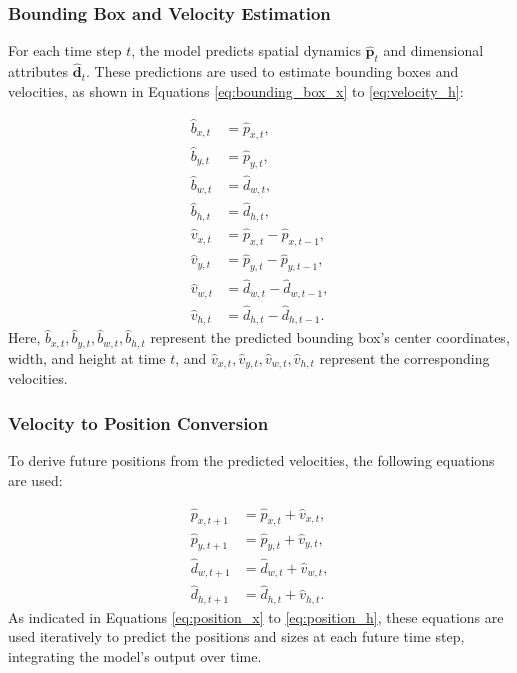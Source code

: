 \documentclass[12pt,oneside]{book} %
\begin{document}
\subsubsection*{Bounding Box and Velocity Estimation}
\noindent For each time step \(t\), the model predicts spatial dynamics \(\hat{\mathbf{p}}_t\) and dimensional attributes \(\hat{\mathbf{d}}_t\). These predictions are used to estimate bounding boxes and velocities, as shown in Equations \eqref{eq:bounding_box_x} to \eqref{eq:velocity_h}:

\begin{align}
    \hat{b}_{x,t} & = \hat{p}_{x,t},                    \label{eq:bounding_box_x} \\
    \hat{b}_{y,t} & = \hat{p}_{y,t},                    \label{eq:bounding_box_y} \\
    \hat{b}_{w,t} & = \hat{d}_{w,t},                    \label{eq:bounding_box_w} \\
    \hat{b}_{h,t} & = \hat{d}_{h,t},                    \label{eq:bounding_box_h} \\
    \hat{v}_{x,t} & = \hat{p}_{x,t} - \hat{p}_{x,t-1},  \label{eq:velocity_x}     \\
    \hat{v}_{y,t} & = \hat{p}_{y,t} - \hat{p}_{y,t-1},  \label{eq:velocity_y}     \\
    \hat{v}_{w,t} & = \hat{d}_{w,t} - \hat{d}_{w,t-1},  \label{eq:velocity_w}     \\
    \hat{v}_{h,t} & = \hat{d}_{h,t} - \hat{d}_{h,t-1}.  \label{eq:velocity_h}
\end{align}
Here, \(\hat{b}_{x,t}, \hat{b}_{y,t}, \hat{b}_{w,t}, \hat{b}_{h,t}\) represent
the predicted bounding box's center coordinates, width, and height at time
\(t\), and \(\hat{v}_{x,t}, \hat{v}_{y,t}, \hat{v}_{w,t}, \hat{v}_{h,t}\)
represent the corresponding velocities.

\subsubsection*{Velocity to Position Conversion}
\noindent To derive future positions from the predicted velocities, the following equations are used:

\begin{align}
    \hat{p}_{x,t+1} & = \hat{p}_{x,t} + \hat{v}_{x,t},  \label{eq:position_x} \\
    \hat{p}_{y,t+1} & = \hat{p}_{y,t} + \hat{v}_{y,t},  \label{eq:position_y} \\
    \hat{d}_{w,t+1} & = \hat{d}_{w,t} + \hat{v}_{w,t},  \label{eq:position_w} \\
    \hat{d}_{h,t+1} & = \hat{d}_{h,t} + \hat{v}_{h,t}.  \label{eq:position_h}
\end{align}
As indicated in Equations \eqref{eq:position_x} to \eqref{eq:position_h}, these
equations are used iteratively to predict the positions and sizes at each
future time step, integrating the model's output over time.
\end{document}
